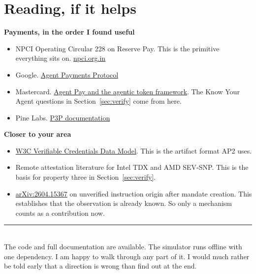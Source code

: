 \documentclass[journal,onecolumn,11pt]{IEEEtran}
\begin{document}
\section*{Reading, if it helps}

\textbf{Payments, in the order I found useful}
\begin{itemize}[leftmargin=*,itemsep=1pt]
\item NPCI Operating Circular 228 on Reserve Pay. This is the primitive everything sits
on. \href{https://www.npci.org.in/what-we-do/upi}{npci.org.in}
\item Google. \href{https://ap2-protocol.org}{Agent Payments Protocol}
\item Mastercard.
\href{https://www.mastercard.com/us/en/business/artificial-intelligence/mastercard-agent-pay.html}{Agent
Pay and the agentic token framework}. The Know Your Agent questions in
Section~\ref{sec:verify} come from here.
\item Pine Labs.
\href{https://www.pinelabs.com/docs/online-payments/ai/p3p}{P3P documentation}
\end{itemize}

\textbf{Closer to your area}
\begin{itemize}[leftmargin=*,itemsep=1pt]
\item \href{https://www.w3.org/TR/vc-data-model-2.0/}{W3C Verifiable Credentials Data
Model}. This is the artifact format AP2 uses.
\item Remote attestation literature for Intel TDX and AMD SEV-SNP. This is the basis for
property three in Section~\ref{sec:verify}.
\item \href{https://arxiv.org/abs/2604.15367}{arXiv:2604.15367} on unverified instruction
origin after mandate creation. This establishes that the observation is already known. So
only a mechanism counts as a contribution now.
\end{itemize}

\vspace{1em}
\noindent\rule{\linewidth}{0.4pt}\\
\small The code and full documentation are available. The simulator runs offline with one
dependency. I am happy to walk through any part of it. I would much rather be told early
that a direction is wrong than find out at the end.
\end{document}
